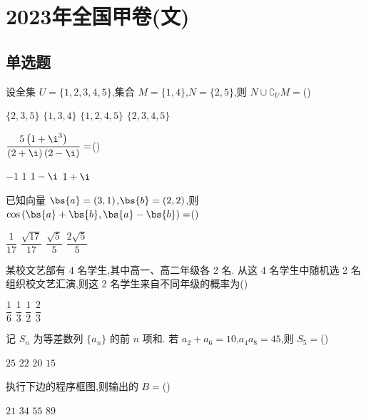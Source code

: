 \chapter{2023年全国甲卷(文)}

\section{单选题}

\begin{problem}
设全集 \(U=\{1,2,3,4,5\}\),集合 \(M=\{1,4\}\),\(N=\{2,5\}\),则 \(N\cup\complement_U M=\)(\quad)

\choices
    {\(\{2,3,5\}\)}
    {\(\{1,3,4\}\)}
    {\(\{1,2,4,5\}\)}
    {\(\{2,3,4,5\}\)}
\end{problem}

\begin{problem}
\(\dfrac{5\left(1+\i^3\right)}{\left(2+\i\right)\left(2-\i\right)}=\)(\quad)

\choices
    {\(-1\)}
    {\(1\)}
    {\(1-\i\)}
    {\(1+\i\)}
\end{problem}

\begin{problem}
已知向量 \(\bs{a}=\left(3,1\right)\),\(\bs{b}=\left(2,2\right)\),则 \(\cos\left(\bs{a}+\bs{b},\bs{a}-\bs{b}\right)=\)(\quad)

\choices
    {\(\dfrac{1}{17}\)}
    {\(\dfrac{\sqrt{17}}{17}\)}
    {\(\dfrac{\sqrt{5}}{5}\)}
    {\(\dfrac{2\sqrt{5}}{5}\)}
\end{problem}

\begin{problem}
某校文艺部有 4 名学生,其中高一、高二年级各 2 名. 从这 4 名学生中随机选 2 名组织校文艺汇演,则这 2 名学生来自不同年级的概率为(\quad)

\choices
    {\(\dfrac{1}{6}\)}
    {\(\dfrac{1}{3}\)}
    {\(\dfrac{1}{2}\)}
    {\(\dfrac{2}{3}\)}
\end{problem}

\begin{problem}
记 \(S_n\) 为等差数列 \(\{a_n\}\) 的前 \(n\) 项和. 若 \(a_2+a_6=10\),\(a_4a_8=45\),则 \(S_5=\)(\quad)

\choices
    {\(25\)}
    {\(22\)}
    {\(20\)}
    {\(15\)}
\end{problem}

\begin{problem}
执行下边的程序框图,则输出的 \(B=\)(\quad)


\choices
    {\(21\)}
    {\(34\)}
    {\(55\)}
    {\(89\)}
\end{problem}

